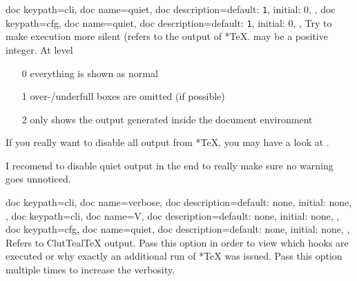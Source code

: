 \documentclass[a4paper, 11pt]{scrartcl}
\let\TeXold\TeX
\newcommand\CluttealTeX{ClutTeal\TeX\xspace}
\renewcommand\TeX{\TeXold\xspace}
\begin{document}
\begin{docKeys}[
		doc parameter={=\meta{quiet}},
	]{
		{
			doc keypath=cli,
			doc name=quiet,
			doc description={default: \texttt{1}, initial: 0},
		},
		{
			doc keypath=cfg,
			doc name=quiet,
			doc description={default: \texttt{1}, initial: 0},
		},
	}
	Try to make execution more silent (refers to the output of *\TeX.
	 may be a positive integer.
	At level
	\begin{itemize}
		\item[0] everything is shown as normal
		\item[1] over-/underfull boxes are omitted (if possible)
		\item[2] only shows the output generated inside the document environment
	\end{itemize}
	If you really want to disable all output from *\TeX, you may have a look at .

	I recomend to disable quiet output in the end to really make sure no warning goes unnoticed.
\end{docKeys}
\begin{docKeys}[
		doc parameter={=\meta{verbose}},
	]{
		{
			doc keypath=cli,
			doc name=verbose,
			doc description={default: none, initial: none},
		},
		{
			doc keypath=cli,
			doc name=V,
			doc description={default: none, initial: none},
		},
		{
			doc keypath=cfg,
			doc name=quiet,
			doc description={default: none, initial: none},
		},
	}
	Refers to \CluttealTeX output.
	Pass this option in order to view which hooks are executed or why exactly an additional run of *\TeX was issued.
	Pass this option multiple times to increase the verbosity.
\end{docKeys}
\end{document}
